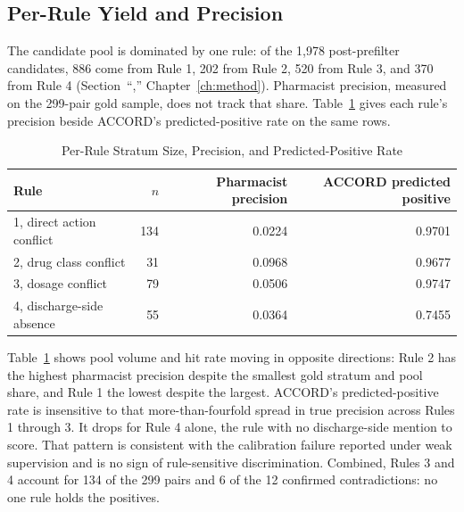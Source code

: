 \begin{table}[H]
\end{table}


\subsection{Per-Rule Yield and Precision}

The candidate pool is dominated by one rule: of the 1,978 post-prefilter candidates,
886 come from Rule 1, 202 from Rule 2, 520 from Rule 3, and 370 from Rule 4
(Section~``,'' Chapter~\ref{ch:method}).  Pharmacist
precision, measured on the 299-pair gold sample, does not track that share.
Table~\ref{tab:rule-precision} gives each rule's precision beside ACCORD's
predicted-positive rate on the same rows.

\begin{table}[H]
\caption{Per-Rule Stratum Size, Precision, and Predicted-Positive Rate}
\label{tab:rule-precision}
\centering
\small
\begin{tabular}{lrrr}
\toprule
\textbf{Rule} & \textbf{$n$} & \textbf{Pharmacist precision} & \textbf{ACCORD predicted positive} \\
\midrule
1, direct action conflict & 134 & 0.0224 & 0.9701 \\
2, drug class conflict    & 31  & 0.0968 & 0.9677 \\
3, dosage conflict        & 79  & 0.0506 & 0.9747 \\
4, discharge-side absence  & 55  & 0.0364 & 0.7455 \\
\bottomrule
\end{tabular}
\end{table}

Table~\ref{tab:rule-precision} shows pool volume and hit rate moving in
opposite directions: Rule 2 has the highest pharmacist precision despite the
smallest gold stratum and pool share, and Rule 1 the lowest despite the
largest. 
ACCORD's predicted-positive rate is insensitive to that more-than-fourfold
spread in true precision across Rules 1 through 3. It drops for Rule 4 alone,
the rule with no discharge-side mention to score. That pattern is consistent with the
calibration failure reported under weak supervision and is no sign of
rule-sensitive discrimination. Combined, Rules 3 and 4 account for 134 of the
299 pairs and 6 of the 12 confirmed contradictions: no one rule holds
the positives.

